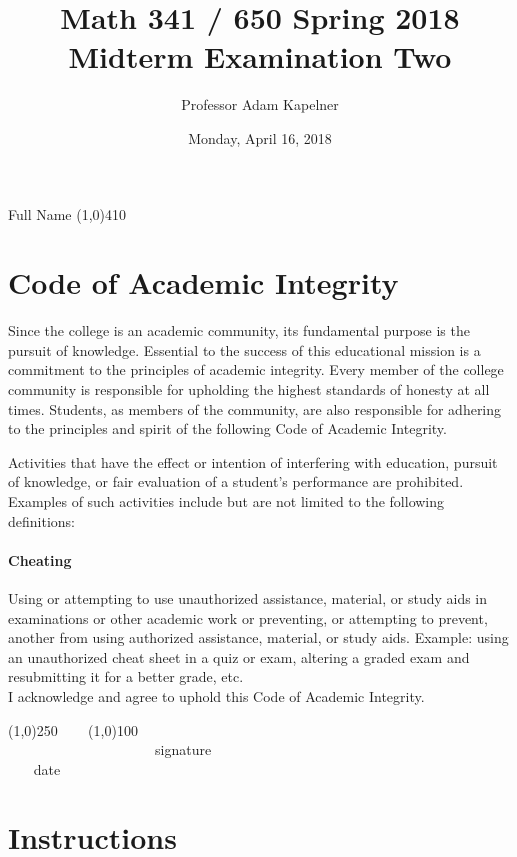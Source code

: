 \documentclass[12pt]{article}
\title{Math 341 / 650 Spring 2018 \\ Midterm Examination Two}
\author{Professor Adam Kapelner}
\date{Monday, April 16, 2018}
\begin{document}
\maketitle

\noindent Full Name \line(1,0){410}

\thispagestyle{empty}

\section*{Code of Academic Integrity}

\footnotesize
Since the college is an academic community, its fundamental purpose is the pursuit of knowledge. Essential to the success of this educational mission is a commitment to the principles of academic integrity. Every member of the college community is responsible for upholding the highest standards of honesty at all times. Students, as members of the community, are also responsible for adhering to the principles and spirit of the following Code of Academic Integrity.

Activities that have the effect or intention of interfering with education, pursuit of knowledge, or fair evaluation of a student's performance are prohibited. Examples of such activities include but are not limited to the following definitions:

\paragraph{Cheating} Using or attempting to use unauthorized assistance, material, or study aids in examinations or other academic work or preventing, or attempting to prevent, another from using authorized assistance, material, or study aids. Example: using an unauthorized cheat sheet in a quiz or exam, altering a graded exam and resubmitting it for a better grade, etc.
\\

\noindent I acknowledge and agree to uphold this Code of Academic Integrity. \\

\begin{center}
\line(1,0){250} ~~~ \line(1,0){100}\\
~~~~~~~~~~~~~~~~~~~~~signature~~~~~~~~~~~~~~~~~~~~~~~~~~~~~~~~~~~~~~~~~~~~~ date
\end{center}

\normalsize

\section*{Instructions}
\end{document}
